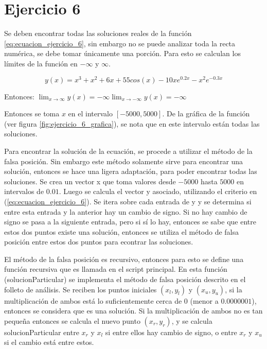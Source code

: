 \documentclass[12pt,letterpaper]{article}
\begin{document}
\section{Ejercicio 6}

Se deben encontrar todas las soluciones reales de la función \ref{eq:ecuacion_ejercicio_6}, sin embargo no se puede analizar toda la recta numérica, se debe tomar únicamente una porción. Para esto se calculan los límites de la función en $-\infty$ y $\infty$. 

\begin{equation}
y(x)=x^3+x^2+6x+55cos(x)-10xe^{0.2x}-x^2e^{-0.3x}
\label{eq:ecuacion_ejercicio_6}
\end{equation}

Entonces:
$\lim_{x\to\infty} y(x)=-\infty
\lim_{x\to -\infty} y(x)=-\infty $

Entonces se toma $x$ en el intervalo $[-5000, 5000]$. De la gráfica de la función (ver figura \ref{fig:ejercicio_6_grafica}), se nota que en este intervalo están todas las soluciones.

Para encontrar la solución de la ecuación, se procede a utilizar el método de la falsa posición. Sin embargo este método solamente sirve para encontrar una solución, entonces se hace una ligera adaptación, para poder encontrar todas las soluciones. Se crea un vector x que toma valores desde $-5000$ hasta $5000$ en intervalos de $0.01$. Luego se calcula el vector y asociado, utilizando el criterio en (\ref{eq:ecuacion_ejercicio_6}). Se itera sobre cada entrada de y y se determina si entre esta entrada y la anterior hay un cambio de signo. Si no hay cambio de signo se pasa a la siguiente entrada, pero si sí lo hay, entonces se sabe que entre estos dos puntos existe una solución, entonces se utiliza el método de falsa posición entre estos dos puntos para econtrar las soluciones. 

El método de la falsa posición es recursivo, entonces para esto se define una función recursiva que es llamada en el script principal. En esta función (solucionParticular) se implementa el método de falsa posición descrito en el folleto de análisis. Se reciben los puntos iniciales $(x_l, y_l)$ y $(x_u, y_u)$, si la multiplicación de ambos está lo suficientemente cerca de $0$ (menor a $0.0000001$), entonces se considera que es una solución. Si la multiplicación de ambos no es tan pequeña entonces se calcula el nuevo punto $(x_r, y_r)$, y se calcula solucionParticular entre $x_r$ y $x_l$ si entre ellos hay cambio de signo, o entre $x_r$ y $x_u$ si el cambio está entre estos. 
\end{document}
